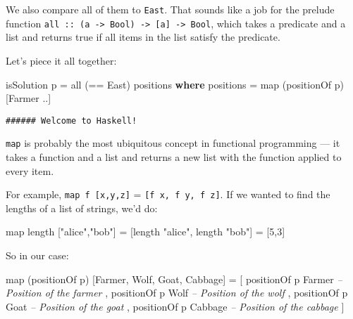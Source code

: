 \documentclass[]{article}
\newenvironment{Shaded}{}{}
\newcommand{\KeywordTok}[1]{\textcolor[rgb]{0.00,0.44,0.13}{\textbf{{#1}}}}
\newcommand{\DataTypeTok}[1]{\textcolor[rgb]{0.56,0.13,0.00}{{#1}}}
\newcommand{\DecValTok}[1]{\textcolor[rgb]{0.25,0.63,0.44}{{#1}}}
\newcommand{\StringTok}[1]{\textcolor[rgb]{0.25,0.44,0.63}{{#1}}}
\newcommand{\CommentTok}[1]{\textcolor[rgb]{0.38,0.63,0.69}{\textit{{#1}}}}
\newcommand{\FunctionTok}[1]{\textcolor[rgb]{0.02,0.16,0.49}{{#1}}}
\newcommand{\NormalTok}[1]{{#1}}
\begin{document}
We also compare all of them to \texttt{East}. That sounds like a job for the
prelude function
\texttt{all\ ::\ (a\ -\textgreater{}\ Bool)\ -\textgreater{}\ {[}a{]}\ -\textgreater{}\ Bool},
which takes a predicate and a list and returns true if all items in the list
satisfy the predicate.

Let's piece it all together:

\begin{Shaded}
\begin{Highlighting}[]
\NormalTok{isSolution p }\FunctionTok{=} \NormalTok{all (}\FunctionTok{==} \DataTypeTok{East}\NormalTok{) positions}
    \KeywordTok{where}
        \NormalTok{positions }\FunctionTok{=} \NormalTok{map (positionOf p) [}\DataTypeTok{Farmer} \FunctionTok{..}\NormalTok{]}
\end{Highlighting}
\end{Shaded}

\begin{verbatim}
###### Welcome to Haskell!
\end{verbatim}

\texttt{map} is probably the most ubiquitous concept in functional programming
--- it takes a function and a list and returns a new list with the function
applied to every item.

For example, \texttt{map\ f\ {[}x,y,z{]}} = \texttt{{[}f\ x,\ f\ y,\ f\ z{]}}.
If we wanted to find the lengths of a list of strings, we'd do:

\begin{Shaded}
\begin{Highlighting}[]
\NormalTok{map length [}\StringTok{"alice"}\NormalTok{,}\StringTok{"bob"}\NormalTok{]}
\FunctionTok{=} \NormalTok{[length }\StringTok{"alice"}\NormalTok{, length }\StringTok{"bob"}\NormalTok{]}
\FunctionTok{=} \NormalTok{[}\DecValTok{5}\NormalTok{,}\DecValTok{3}\NormalTok{]}
\end{Highlighting}
\end{Shaded}

So in our case:

\begin{Shaded}
\begin{Highlighting}[]
\NormalTok{map (positionOf p) [}\DataTypeTok{Farmer}\NormalTok{, }\DataTypeTok{Wolf}\NormalTok{, }\DataTypeTok{Goat}\NormalTok{, }\DataTypeTok{Cabbage}\NormalTok{]}
\FunctionTok{=} \NormalTok{[ positionOf p }\DataTypeTok{Farmer}         \CommentTok{-- Position of the farmer}
  \NormalTok{, positionOf p }\DataTypeTok{Wolf}           \CommentTok{-- Position of the wolf}
  \NormalTok{, positionOf p }\DataTypeTok{Goat}           \CommentTok{-- Position of the goat}
  \NormalTok{, positionOf p }\DataTypeTok{Cabbage}        \CommentTok{-- Position of the cabbage}
  \NormalTok{]}
\end{Highlighting}
\end{Shaded}
\end{document}
